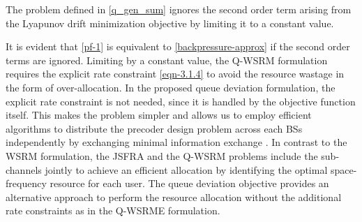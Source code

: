 The problem defined in \eqref{q_gen_sum} ignores the second order term arising from the Lyapunov drift minimization objective by limiting it to a constant value. 

It is evident that \eqref{pf-1} is equivalent to \eqref{backpressure-approx} if the second order terms are ignored. Limiting  by a constant value, the \ac{Q-WSRM} formulation requires the explicit rate constraint \eqref{eqn-3.1.4} to avoid the resource wastage in the form of over-allocation. In the proposed queue deviation formulation, the explicit rate constraint is not needed, since it is handled by the objective function itself. This makes the problem simpler and allows us to employ efficient algorithms to distribute the precoder design problem across each \acp{BS} independently by exchanging minimal information exchange \cite{boyd2011distributed}. In contrast to the \ac{WSRM} formulation, the \ac{JSFRA} and the \ac{Q-WSRM} problems include the sub-channels jointly to achieve an efficient allocation by identifying the optimal space-frequency resource for each user. The queue deviation objective provides an alternative approach to perform the resource allocation without the additional rate constraints as in the \ac{Q-WSRME} formulation.
